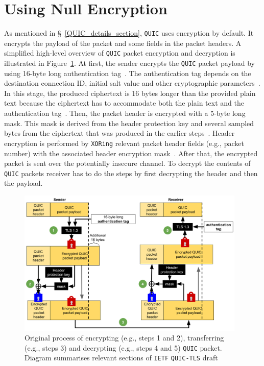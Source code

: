 \documentclass[12pt,a4paper,twoside,openright]{report}
\begin{document}
\section{Using Null Encryption}

As mentioned in \S~\ref{QUIC_details_section}, \texttt{QUIC} uses encryption by default.
It encrypts the payload of the packet and some fields in the packet headers.
A simplified high-level overview of \texttt{QUIC} packet encryption and decryption is illustrated in Figure~\ref{fig:Cryptographic_procedures_of_quic}.
At first, the sender encrypts the \texttt{QUIC} packet payload by using 16-byte long authentication tag~\cite[Section 5]{ietf-quic-tls-32}. 
The authentication tag depends on the destination connection ID, initial salt value and other cryptographic parameters~\cite[Section 5]{ietf-quic-tls-32}.
In this stage, the produced ciphertext is 16 bytes longer than the provided plain text because the ciphertext has to accommodate both the plain text and the authentication tag~\cite[Section 5.3]{ietf-quic-tls-32}.
Then, the packet header is encrypted with a 5-byte long mask.
This mask is derived from the header protection key and several sampled bytes from the ciphertext that was produced in the earlier steps~\cite[Section 5]{ietf-quic-tls-32}. 
Header encryption is performed by \texttt{XORing} relevant packet header fields (e.g., packet number) with the associated header encryption mask~\cite[Section 5]{ietf-quic-tls-32}.
After that, the encrypted packet is sent over the potentially insecure channel.
To decrypt the contents of \texttt{QUIC} packets receiver has to do the steps by first decrypting the header and then the payload.

    \begin{figure}[H]
    \centering
    \includegraphics[width=0.97\textwidth]{figs/Cryptographic_procedures_of_quic.png}
    \caption[Original process of encrypting, transferring and decrypting \texttt{QUIC} packet]{Original process of encrypting (e.g., steps 1 and 2), transferring  (e.g., steps 3) and decrypting (e.g., steps 4 and 5) \texttt{QUIC} packet. Diagram summarises relevant sections of \texttt{IETF} \texttt{QUIC-TLS} draft~\cite[Section 5]{ietf-quic-tls-32}}
    \label{fig:Cryptographic_procedures_of_quic}
    \end{figure}
\end{document}

